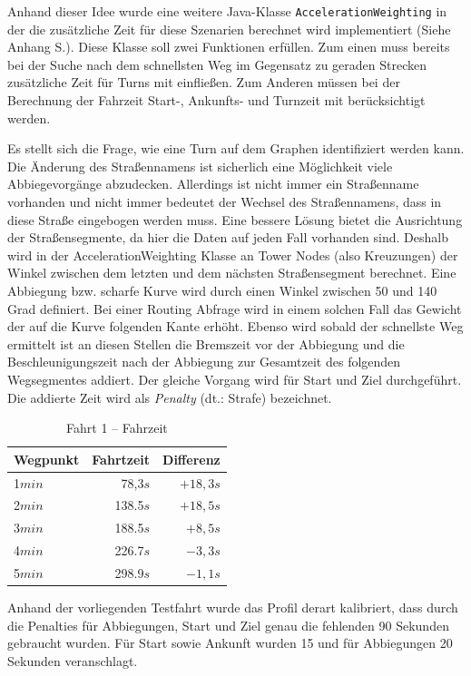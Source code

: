 Anhand dieser Idee wurde eine weitere Java-Klasse \texttt{AccelerationWeighting} in der die zusätzliche Zeit für diese Szenarien berechnet wird implementiert (Siehe Anhang S.\pageref{sec:source}).
Diese Klasse soll zwei Funktionen erfüllen.
Zum einen muss bereits bei der Suche nach dem schnellsten Weg im Gegensatz zu geraden Strecken zusätzliche Zeit für Turns mit einfließen.
Zum Anderen müssen bei der Berechnung der Fahrzeit Start-, Ankunfts- und Turnzeit mit berücksichtigt werden.

Es stellt sich die Frage, wie eine Turn auf dem Graphen identifiziert werden kann.
Die Änderung des Straßennamens ist sicherlich eine Möglichkeit viele Abbiegevorgänge abzudecken.
Allerdings ist nicht immer ein Straßenname vorhanden und nicht immer bedeutet der Wechsel des Straßennamens, dass in diese Straße eingebogen werden muss.
Eine bessere Lösung bietet die Ausrichtung der Straßensegmente, da hier die Daten auf jeden Fall vorhanden sind.
Deshalb wird in der AccelerationWeighting Klasse an Tower Nodes (also Kreuzungen) der Winkel zwischen dem letzten und dem nächsten Straßensegment berechnet.
Eine Abbiegung bzw.
scharfe Kurve wird durch einen Winkel zwischen 50 und 140 Grad definiert.
Bei einer Routing Abfrage wird in einem solchen Fall das Gewicht der auf die Kurve folgenden Kante erhöht.
Ebenso wird sobald der schnellste Weg ermittelt ist an diesen Stellen die Bremszeit vor der Abbiegung und die Beschleunigungszeit nach der Abbiegung zur Gesamtzeit des folgenden Wegsegmentes addiert.
Der gleiche Vorgang wird für Start und Ziel durchgeführt.
Die addierte Zeit wird als \textit{Penalty} (dt.: Strafe) bezeichnet.

\begin{table}[htb]
\centering
\caption{Fahrt 1 -- Fahrzeit}
\label{tab:drive11}
\begin{tabular}{|l|r|r|}
\hline
Wegpunkt & Fahrtzeit & Differenz \\ \hline 
1$min$ & 78,3$s$ & $+18,3s$ \\
2$min$ & 138.5$s$ & $+18,5s$ \\
3$min$ & 188.5$s$ & $+8,5s$ \\
4$min$ & 226.7$s$ & $-3,3s$ \\
5$min$ & 298.9$s$ & $-1,1s$ \\
\hline
\end{tabular}
\end{table}

Anhand der vorliegenden Testfahrt wurde das Profil derart kalibriert, dass durch die Penalties für Abbiegungen, Start und Ziel genau die fehlenden 90 Sekunden gebraucht wurden.
Für Start sowie Ankunft wurden 15 und für Abbiegungen 20 Sekunden veranschlagt.


